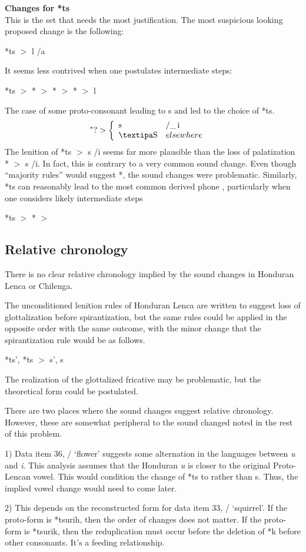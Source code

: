 \documentclass[12pt]{article}
\begin{document}
{\bf Changes for *ts} \\
This is the set that needs the most justification. The most suspicious looking proposed change is the following:
\begin{center} *ts $>$ l /a\und \end{center}
It seems less contrived when one postulates intermediate steps:
\begin{center} *ts $>$ * $>$ *\ip{\textbeltl} $>$ * $>$ l \end{center} 
The case of some proto-consonant leading to s and  led to the choice of *ts.
\begin{align*}^*\textrm{?} &> \left\{\begin{array}{ll}
\textrm{s} & /\und\textrm{i} \\
\textrm{\ip{S}} & elsewhere
\end{array}\right.\end{align*}
The lenition of *ts $>$ s /\und i seems far more plausible than the loss of palatization * $>$ s /\und i. In fact, this is contrary to a very common sound change. Even though ``majority rules'' would suggest *, the sound changes were problematic. Similarly, *ts can reasonably lead to the most common derived phone , particularly when one considers likely intermediate steps
\begin{center} *ts $>$ * $>$  \end{center}

\subsection{Relative chronology}

There is no clear relative chronology implied by the sound changes in Honduran Lenca or Chilenga. 

The unconditioned lenition rules of Honduran Lenca are written to suggest loss of glottalization before spirantization, but the same rules could be applied in the opposite order with the same outcome, with the minor change that the spirantization rule would be as follows. 
\begin{center}*ts', *ts $>$ s', s\end{center} The realization of the glottalized fricative may be problematic, but the theoretical form could be postulated.

There are two places where the sound changes suggest relative chronology. However, these are somewhat peripheral to the sound changed noted in the rest of this problem.

1) Data item 36,  /  `flower' suggests some alternation in the languages between {\it u} and {\it i}. This analysis assumes that the Honduran {\it u} is closer to the original Proto-Lencan vowel. This would condition the change of *ts to  rather than s. Thus, the implied vowel change would need to come later.

2) This depends on the reconstructed form for data item 33,  /  `squirrel'. If the proto-form is *tsurih, then the order of changes does not matter. If the proto-form is *tsurik, then the reduplication must occur before the deletion of *k before other consonants. It's a feeding relationship.
\end{document}

